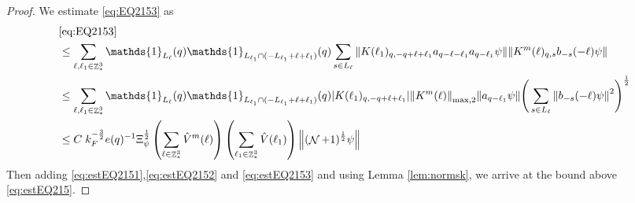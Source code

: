 \documentclass[sn-mathphys, Numbered ,a4paper]{sn-jnl}%
\DeclareMathOperator{\Z}{\mathbb{Z}}
\DeclareMathOperator{\NN}{\mathcal{N}}
\newcommand{\half}{\frac{1}{2}}
\theoremstyle{plain}
\theoremstyle{definition}
\theoremstyle{remark}
\theoremstyle{plain}
\theoremstyle{definition}
\theoremstyle{remark}
\begin{document}
\begin{proof}
We estimate \eqref{eq:EQ2153} as 
\begin{align}
	&\eqref{eq:EQ2153}\nonumber\\
	&\leq  \sum\limits_{\ell, \ell_1\in \Z^3_*} \mathds{1}_{L_{\ell}}(q) \mathds{1}_{L_{\ell_1}\cap (-L_{\ell_1}+\ell+\ell_1)}(q) \sum\limits_{ s \in L_{\ell}} \norm{K(\ell_1)_{q,-q+\ell+\ell_1} a_{q-\ell-\ell_1}  a_{q-\ell_1} \psi} \norm{ K^m(\ell)_{q,s}  b_{-s}(-\ell) \psi }\nonumber\\
	&\leq  \sum\limits_{\ell, \ell_1\in \Z^3_*} \mathds{1}_{L_{\ell}}(q) \mathds{1}_{L_{\ell_1}\cap (-L_{\ell_1}+\ell+\ell_1)}(q) \abs{K(\ell_1)_{q,-q+\ell+\ell_1}} \norm{K^m(\ell)}_{\mathrm{max,2}} \norm{  a_{q-\ell_1} \psi} \Bigg( \sum\limits_{ s \in L_{\ell}} \norm{ b_{-s}(-\ell) \psi }^2\Bigg)^\half\nonumber\\
	&\leq   C\; k_F^{-\frac{3}{2}} e(q)^{-1}\Xi_{\psi}^\half \left(\sum\limits_{\ell \in \Z^3_*} \hat{V}^{m}(\ell)\right)\left( \sum\limits_{\ell_1\in \Z^3_*} \hat{V}(\ell_1) \right) \norm{ (\NN+1)^\half \psi } \label{eq:estEQ2153}
\end{align}
Then adding \eqref{eq:estEQ2151},\eqref{eq:estEQ2152} and \eqref{eq:estEQ2153} and using Lemma \ref{lem:normsk}, we arrive at the bound above \eqref{eq:estEQ215}.
\end{proof}
\end{document}
